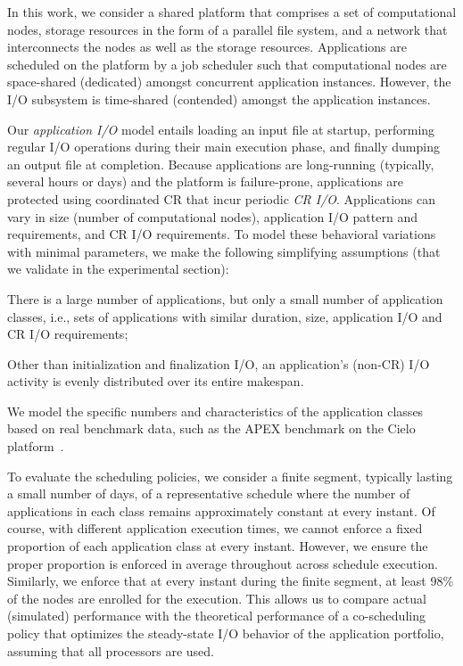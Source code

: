 In this work, we consider a shared platform that comprises a set of computational
nodes, storage resources in the form of a parallel file system, and a network that
interconnects the nodes as well as the storage resources. Applications are scheduled
on the platform by a job scheduler such that computational nodes are space-shared
(dedicated) amongst concurrent application instances. However, the I/O subsystem is
time-shared (contended) amongst the application instances.

Our \emph{application I/O} model entails loading an input file at startup, performing
regular I/O operations during their main execution phase, and finally dumping an
output file at completion. Because applications are long-running (typically, several
hours or days) and the platform is failure-prone, applications are protected using
coordinated CR that incur periodic \emph{CR I/O}.
Applications can vary in size (number of computational nodes), application I/O
pattern and requirements, and CR I/O requirements. To model these behavioral
variations with minimal parameters, we make the following simplifying assumptions
(that we validate in the experimental section):
\begin{compactitem}
  \item There is a large number of applications, but only a small number of
    application classes, i.e., sets of applications with similar duration, size,
    application I/O and CR I/O requirements;
  \item Other than initialization and finalization I/O, an application's (non-CR) I/O
    activity is evenly distributed over its entire makespan.
\end{compactitem}
We model the specific numbers and characteristics of the application classes based on
real benchmark data, such as the APEX benchmark on the Cielo platform~\cite{apex2016}.

To evaluate the scheduling policies, we consider a finite segment, typically lasting
a small number of days, of a representative schedule where the number of applications
in each class remains approximately constant at every instant. Of course, with
different application execution times, we cannot enforce a fixed proportion of each
application class at every instant. However, we ensure the proper proportion is
enforced in average throughout across schedule execution. Similarly, we enforce
that at every instant during the finite segment, at least 98\% of the nodes
are enrolled for the execution. This allows us to compare actual
(simulated) performance with the theoretical performance of a co-scheduling policy
that optimizes the steady-state I/O behavior of the application portfolio, assuming
that all processors are used.

